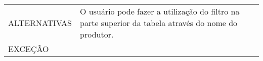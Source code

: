 \begin{longtable}[c]{@{}|p{4cm}|p{9cm}|@{}}
\begin{minipage}[t]{0.47\columnwidth}
\end{minipage}
\\\hline
\begin{minipage}[t]{0.47\columnwidth}
ALTERNATIVAS
\end{minipage} & \begin{minipage}[t]{0.47\columnwidth}
O usuário pode fazer a utilização do filtro na parte superior da tabela
através do nome do produtor.
\end{minipage}
\\\hline
\begin{minipage}[t]{0.47\columnwidth}
EXCEÇÃO
\end{minipage} & \begin{minipage}[t]{0.47\columnwidth}
\end{minipage}
\\\hline

\end{longtable}

